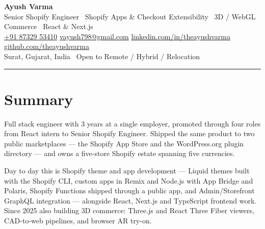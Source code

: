 \documentclass[10pt]{article}
\newcommand{\myphone}{\href{https://wa.me/918732953410}{+91 87329 53410}}
\begin{document}
\pagestyle{empty}

\begin{center}
{\Huge \bfseries Ayush Varma}\\[3pt]
{\small\color{textgray}
  Senior Shopify Engineer \textbullet\ Shopify Apps \& Checkout Extensibility \textbullet\ 3D / WebGL Commerce \textbullet\ React \& Next.js
}\\[3pt]
{\small
  \myphone \quad
  \href{mailto:vayush798@gmail.com}{vayush798@gmail.com} \quad
  \href{https://linkedin.com/in/theayushvarma}{linkedin.com/in/theayushvarma} \quad
  \href{https://github.com/theayushvarma}{github.com/theayushvarma}
}\\[2pt]
{\small Surat, Gujarat, India \textbullet\ Open to Remote / Hybrid / Relocation}
\end{center}

\hrule

\section*{Summary}
Full stack engineer with 3 years at a single employer, promoted through four roles from React intern to Senior Shopify Engineer. Shipped the same product to two public marketplaces --- the Shopify App Store and the WordPress.org plugin directory --- and owns a five-store Shopify estate spanning five currencies.

Day to day this is Shopify theme and app development --- Liquid themes built with the Shopify CLI, custom apps in Remix and Node.js with App Bridge and Polaris, Shopify Functions shipped through a public app, and Admin/Storefront GraphQL integration --- alongside React, Next.js and TypeScript frontend work. Since 2025 also building 3D commerce: Three.js and React Three Fiber viewers, CAD-to-web pipelines, and browser AR try-on.

\end{document}
